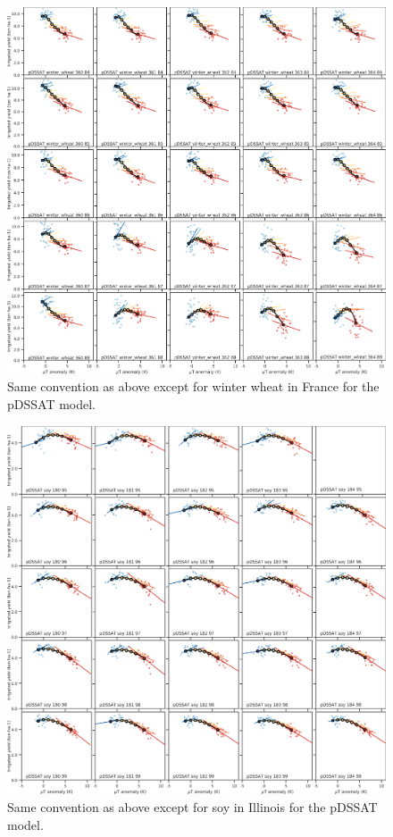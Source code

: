 \documentclass[10pt]{article}
\begin{document}
\begin{figure}[h!]
\centering
\includegraphics[width=\textwidth]{tempyearvclim_winter_wheat_pDSSAT.png}
\caption{Same convention as above except for winter wheat in France for the pDSSAT model.}
\label{fig:pdssatwwh}
\end{figure}

\begin{figure}[h!]
\centering
\includegraphics[width=\textwidth]{tempyearvclim_soy_pDSSAT.png}
\caption{Same convention as above except for soy in Illinois for the pDSSAT model.}
\label{fig:pdssatsoy}
\end{figure}
\end{document}
